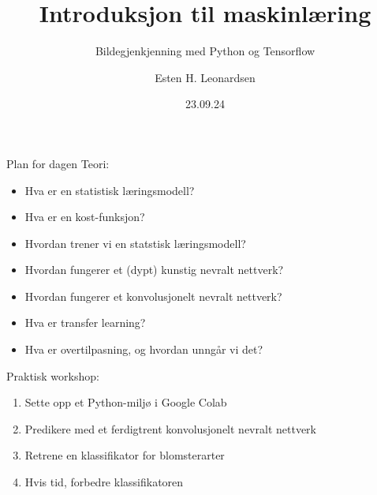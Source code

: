 \documentclass[8pt]{beamer}
\date{23.09.24}
\title{Introduksjon til maskinlæring}
\subtitle{Bildegjenkjenning med Python og Tensorflow}
\author{Esten H. Leonardsen}
\begin{document}
	\newcommand{\cnnchannel}[4]{
		\def\cellsize{0.15}
		\foreach \i in {1,...,#3} {
			\foreach \j in {1,...,#3} {
				\pgfmathsetmacro{\ioffset}{(\i - floor(#3 / 2))}
				\pgfmathsetmacro{\joffset}{(\j - floor(#3 / 2))}
				\node[
					draw=black,
					fill=green!20,
					minimum width=\cellsize cm,
					minimum height=\cellsize cm,
					anchor=south east,
					inner sep=0pt
				] (#4\i\j) at ({#1 - (\ioffset * \cellsize)}, {#2 - (\joffset * \cellsize)}) {};

			}
		}
	}

	\newcommand{\cnnlayer}[5]{
		\pgfmathsetmacro{\rounded}{floor(#4 / 2)}
		\message{\rounded}
		\foreach \c in {1,...,#4} {
			\pgfmathsetmacro{\offset}{\c - 1 - \rounded}
			\cnnchannel{#1 + \offset * 0.1}{#2 - \offset * 0.1}{#3}{#5\c}
		}
	}

	 \begin{frame}
	 	\maketitle
	 \end{frame}

	\begin{frame}{Plan for dagen}
		\vfill
		Teori:
		\begin{itemize}
			\item Hva er en statistisk læringsmodell?
			\item Hva er en kost-funksjon?
			\item Hvordan trener vi en statstisk læringsmodell?
			\item Hvordan fungerer et (dypt) kunstig nevralt nettverk?
			\item Hvordan fungerer et konvolusjonelt nevralt nettverk?
			\item Hva er transfer learning?
			\item Hva er overtilpasning, og hvordan unngår vi det?
		\end{itemize}
		Praktisk workshop:
		\begin{enumerate}
			\item Sette opp et Python-miljø i Google Colab
			\item Predikere med et ferdigtrent konvolusjonelt nevralt nettverk
			\item Retrene en klassifikator for blomsterarter
			\item Hvis tid, forbedre klassifikatoren
		\end{enumerate}
		\vfill
	\end{frame}
\end{document}

